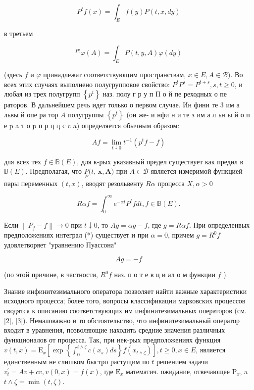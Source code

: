 \documentclass[10pt]{article}
\begin{document}
\[
P^{t} f(x)=\int_{E} f(y) P(t, x, d y)
\]

в третьем

\[
{ }^{P t} \varphi(A)=\int_{E} P(t, y, A) \varphi(d y)
\]

(здесь $f$ и $\varphi$ принадлежат соответствующим пространствам, $x \in E, A \in \mathscr{B})$. Во всех этих случаях выполнено полугрупповое свойство: $P^{t} P^{s}=P^{t+s}, s, t \geqslant 0$, и любая из трех полугрупп $\left\{p^{t}\right\}$ наз. полу г р у п П о й пе реходных о пе раторов. В дальнейшем речь идет только о первом случае. Ин фини те 3 им а львы й опе ра тор $A$ полугруппы $\left\{p^{t}\right\}$ (он же- и нфи н и те з им а л ьн ы й о п е p a т о p п р ц ц с c a) определяется обычным образом:

\[
A f=\lim _{t \downarrow 0} t^{-1}\left(p^{t} f-f\right)
\]

для всех тех $f \in \mathbb{B}(E)$, для к-рых указавный предел существует как предөл в $\mathbb{B}(E)$. Предполагая, что $\underset{P}{P}(t$, $\boldsymbol{x}, \boldsymbol{A})$ при $A \in \mathscr{B}$ является измеримой функцией пары переменных $(t, x)$, вводят резольвенту $R \alpha$ процесса $X, \alpha>0$

\[
R \alpha f=\int_{0}^{\infty} e^{-\alpha t} P^{t} f d t, f \in \mathbb{B}(E) .
\]

Если $\left\|P_{f}-f\right\| \rightarrow 0$ при $t \downarrow 0$, то $A g=\alpha g-f$, где $g=R \alpha f$. При определенвых предположениях интеграл (*) существует и при $\alpha=0$, причем $g=R^{0} f$ удовлетворяет "уравнению Пуассона"

\[
A g=-f
\]

(по этой причине, в частности, $R^{0} f$ наз. п о т е в ц и ал о м функции $f$ ).

Знание инфинитезимального оператора позволяет найти важные характеристики исходного процесса; более того, вопросы классификации марковских процессов сводятся к описанию соответствующих им инфинитезимальных операторов (см. [2], [3]). Немаловажно и то обстоятельство, что инфинитезимальный оператор входит в уравнения, позволяющие находить средние значения различных функционалов от процесса. Так, при нек-рых предположениях функция $v(t, x)=\mathrm{E}_{x}\left[\exp \left\{\int_{0}^{t \wedge \zeta} c\left(x_{s}\right) d s\right\} f\left(x_{t \wedge \zeta}\right)\right], t \geqslant 0, x \in E$, является единственным не слишком быстро растущим по $t$ решением задачи $v_{t}^{\prime}=A v+c v, v(0, x)=f(x)$, где $\mathrm{E}_{x}$ математич. ожидание, отвечающее $\mathrm{P}_{x}$, a $t \wedge \zeta=\min (t, \zeta)$.
\end{document}

